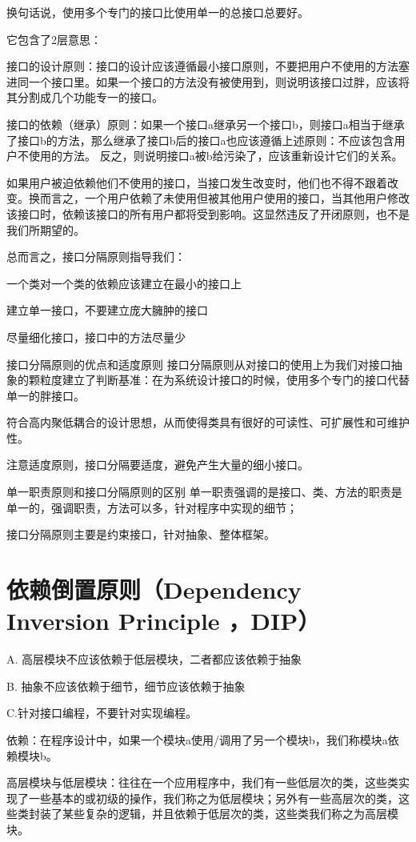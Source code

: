 换句话说，使用多个专门的接口比使用单一的总接口总要好。

它包含了2层意思：

接口的设计原则：接口的设计应该遵循最小接口原则，不要把用户不使用的方法塞进同一个接口里。如果一个接口的方法没有被使用到，则说明该接口过胖，应该将其分割成几个功能专一的接口。

接口的依赖（继承）原则：如果一个接口a继承另一个接口b，则接口a相当于继承了接口b的方法，那么继承了接口b后的接口a也应该遵循上述原则：不应该包含用户不使用的方法。 反之，则说明接口a被b给污染了，应该重新设计它们的关系。

如果用户被迫依赖他们不使用的接口，当接口发生改变时，他们也不得不跟着改变。换而言之，一个用户依赖了未使用但被其他用户使用的接口，当其他用户修改该接口时，依赖该接口的所有用户都将受到影响。这显然违反了开闭原则，也不是我们所期望的。

总而言之，接口分隔原则指导我们：

一个类对一个类的依赖应该建立在最小的接口上

建立单一接口，不要建立庞大臃肿的接口

尽量细化接口，接口中的方法尽量少

接口分隔原则的优点和适度原则
接口分隔原则从对接口的使用上为我们对接口抽象的颗粒度建立了判断基准：在为系统设计接口的时候，使用多个专门的接口代替单一的胖接口。

符合高内聚低耦合的设计思想，从而使得类具有很好的可读性、可扩展性和可维护性。

注意适度原则，接口分隔要适度，避免产生大量的细小接口。

单一职责原则和接口分隔原则的区别
单一职责强调的是接口、类、方法的职责是单一的，强调职责，方法可以多，针对程序中实现的细节；

接口分隔原则主要是约束接口，针对抽象、整体框架。

\section{依赖倒置原则（Dependency Inversion Principle ，DIP）}
A. 高层模块不应该依赖于低层模块，二者都应该依赖于抽象

B. 抽象不应该依赖于细节，细节应该依赖于抽象

C.针对接口编程，不要针对实现编程。

依赖：在程序设计中，如果一个模块a使用/调用了另一个模块b，我们称模块a依赖模块b。

高层模块与低层模块：往往在一个应用程序中，我们有一些低层次的类，这些类实现了一些基本的或初级的操作，我们称之为低层模块；另外有一些高层次的类，这些类封装了某些复杂的逻辑，并且依赖于低层次的类，这些类我们称之为高层模块。

